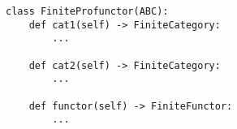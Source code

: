 \par\begin{minipage}{60ex}
\begin{verbatim}
class FiniteProfunctor(ABC):
    def cat1(self) -> FiniteCategory:
        ...

    def cat2(self) -> FiniteCategory:
        ...

    def functor(self) -> FiniteFunctor:
        ...
\end{verbatim}
\end{minipage}\par